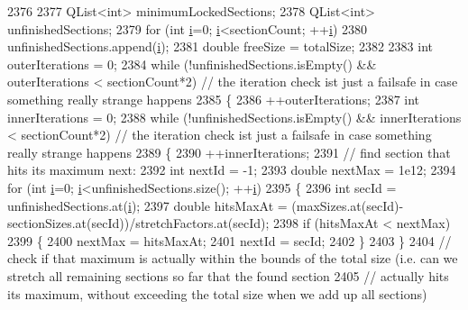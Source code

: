 \begin{DoxyCode}
2376   
2377   QList<int> minimumLockedSections;
2378   QList<int> unfinishedSections;
2379   \textcolor{keywordflow}{for} (\textcolor{keywordtype}{int} \hyperlink{_comparision_pictures_2_createtest_image_8m_a6f6ccfcf58b31cb6412107d9d5281426}{i}=0; \hyperlink{_comparision_pictures_2_createtest_image_8m_a6f6ccfcf58b31cb6412107d9d5281426}{i}<sectionCount; ++\hyperlink{_comparision_pictures_2_createtest_image_8m_a6f6ccfcf58b31cb6412107d9d5281426}{i})
2380     unfinishedSections.append(\hyperlink{_comparision_pictures_2_createtest_image_8m_a6f6ccfcf58b31cb6412107d9d5281426}{i});
2381   \textcolor{keywordtype}{double} freeSize = totalSize;
2382   
2383   \textcolor{keywordtype}{int} outerIterations = 0;
2384   \textcolor{keywordflow}{while} (!unfinishedSections.isEmpty() && outerIterations < sectionCount*2) \textcolor{comment}{// the iteration check ist just
       a failsafe in case something really strange happens}
2385   \{
2386     ++outerIterations;
2387     \textcolor{keywordtype}{int} innerIterations = 0;
2388     \textcolor{keywordflow}{while} (!unfinishedSections.isEmpty() && innerIterations < sectionCount*2) \textcolor{comment}{// the iteration check ist
       just a failsafe in case something really strange happens}
2389     \{
2390       ++innerIterations;
2391       \textcolor{comment}{// find section that hits its maximum next:}
2392       \textcolor{keywordtype}{int} nextId = -1;
2393       \textcolor{keywordtype}{double} nextMax = 1e12;
2394       \textcolor{keywordflow}{for} (\textcolor{keywordtype}{int} \hyperlink{_comparision_pictures_2_createtest_image_8m_a6f6ccfcf58b31cb6412107d9d5281426}{i}=0; \hyperlink{_comparision_pictures_2_createtest_image_8m_a6f6ccfcf58b31cb6412107d9d5281426}{i}<unfinishedSections.size(); ++\hyperlink{_comparision_pictures_2_createtest_image_8m_a6f6ccfcf58b31cb6412107d9d5281426}{i})
2395       \{
2396         \textcolor{keywordtype}{int} secId = unfinishedSections.at(\hyperlink{_comparision_pictures_2_createtest_image_8m_a6f6ccfcf58b31cb6412107d9d5281426}{i});
2397         \textcolor{keywordtype}{double} hitsMaxAt = (maxSizes.at(secId)-sectionSizes.at(secId))/stretchFactors.at(secId);
2398         \textcolor{keywordflow}{if} (hitsMaxAt < nextMax)
2399         \{
2400           nextMax = hitsMaxAt;
2401           nextId = secId;
2402         \}
2403       \}
2404       \textcolor{comment}{// check if that maximum is actually within the bounds of the total size (i.e. can we stretch all
       remaining sections so far that the found section}
2405       \textcolor{comment}{// actually hits its maximum, without exceeding the total size when we add up all sections)}

\end{DoxyCode}
